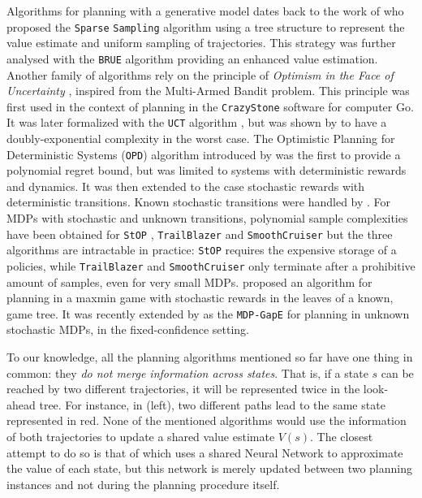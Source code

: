 \documentclass[runningheads]{llncs}
\begin{document}
Algorithms for planning with a generative model dates back to the work of \citet{Kearns02SS} who proposed the \texttt{Sparse} \texttt{Sampling} algorithm using a tree structure to represent the value estimate and uniform sampling of trajectories. This strategy was further analysed with the \texttt{BRUE} algorithm \citep{Feldman14BRUE} providing an enhanced value estimation. Another family of algorithms rely on the principle of \emph{Optimism in the Face of Uncertainty} \citep[surveyed by][]{Munos14}, inspired from the Multi-Armed Bandit problem. This principle was first used in the context of planning in the \texttt{CrazyStone} software \citep{Coulom2006} for computer Go. It was later formalized with the \texttt{UCT} algorithm \citep{Kocsis06UCT}, but was shown by \citet{Coquelin2007} to have a doubly-exponential complexity in the worst case. The {Optimistic Planning for Deterministic Systems} (\texttt{OPD}) algorithm introduced by \citet{Hren2008optimistic} was the first to provide a polynomial regret bound, but was limited to systems with deterministic rewards and dynamics. It was then extended to the case stochastic rewards \citep{Bubeck2010open,Leurent2019practical} with deterministic transitions.
Known stochastic transitions were handled by \citet{Busoniu2012optimistic}. For MDPs with stochastic and unknown transitions, polynomial sample complexities have been obtained for \texttt{StOP} \citep{Szorenyi14}, \texttt{TrailBlazer} \citep{Grill16} and \texttt{SmoothCruiser} \citep{Grill19} but the three algorithms are intractable in practice: \texttt{StOP} requires the expensive storage of a policies, while \texttt{TrailBlazer} and \texttt{SmoothCruiser} only terminate after a prohibitive amount of samples, even for very small MDPs. 
\citep{Kaufmann2017} proposed an algorithm for planning in a maxmin game with stochastic rewards in the leaves of a known, game tree. It was recently extended by \citet{MDPGapE2020} as the \texttt{MDP-GapE} for planning in unknown stochastic MDPs, in the fixed-confidence setting.

To our knowledge, all the planning algorithms mentioned so far have one thing in common: they \emph{do not merge information across states}. That is, if a state $s$ can be reached by two different trajectories, it will be represented twice in the look-ahead tree. For instance, in  (left), two different paths lead to the same state represented in red. None of the mentioned algorithms would use the information of both trajectories to update a shared value estimate $V(s)$. The closest attempt to do so is that of \citet{Silver18} which uses a shared Neural Network to approximate the value of each state, but this network is merely updated between two planning instances and not during the planning procedure itself.
\end{document}

